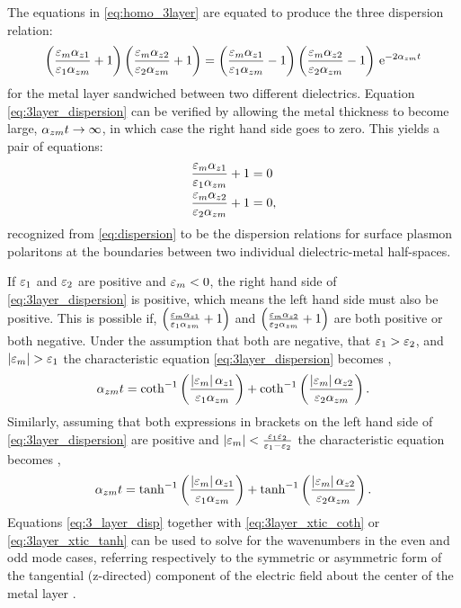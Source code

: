 \documentclass[11pt]{article}
\begin{document}
%
The equations in \eqref{eq:homo_3layer} are equated to produce the three dispersion relation:
%
\begin{equation}
  \left(\frac{\varepsilon_m \alpha_{z1}}{\varepsilon_1 \alpha_{zm}} + 1 \right) \left(\frac{\varepsilon_m \alpha_{z2}}{\varepsilon_2 \alpha_{zm}} + 1 \right) = \left(\frac{\varepsilon_m \alpha_{z1}}{\varepsilon_1 \alpha_{zm}} - 1 \right) \left(\frac{\varepsilon_m \alpha_{z2}}{\varepsilon_2 \alpha_{zm}} - 1 \right) \, \mathrm{e}^{-2\alpha_{zm}t}
  \label{eq:3layer_dispersion}
\end{equation}
%
for the metal layer sandwiched between two different dielectrics. Equation \eqref{eq:3layer_dispersion} can be verified by allowing the metal thickness to become large, $\alpha_{zm}t \rightarrow \infty$, in which case the right hand side goes to zero. This yields a pair of equations:
%
\begin{subequations}
  \begin{align}
    \frac{\varepsilon_m \alpha_{z1}}{\varepsilon_1 \alpha_{zm}} + 1 ={}& 0
    \label{eq:simplified1_3layer_to2layer}\\
    \frac{\varepsilon_m \alpha_{z2}}{\varepsilon_2 \alpha_{zm}} + 1 ={}& 0,
    \label{eq:simplified2_3layer_to2layer}
  \end{align}
  \label{eq:simplified_3layer_to2layer}
\end{subequations}
%
recognized from \eqref{eq:dispersion} to be the dispersion relations for surface plasmon polaritons at the boundaries between two individual dielectric-metal half-spaces.

If $\varepsilon_1$ and $\varepsilon_2$ are positive and $\varepsilon_m < 0$, the right hand side of \eqref{eq:3layer_dispersion} is positive, which means the left hand side must also be positive. This is possible if,
$\left( \frac{\varepsilon_m \alpha_{z1}}{\varepsilon_1 \alpha_{zm}} + 1 \right)$ and
$\left( \frac{\varepsilon_m \alpha_{z2}}{\varepsilon_2 \alpha_{zm}} + 1 \right)$ are both positive or both negative. Under the assumption that both are negative, that
$ \varepsilon_1 > \varepsilon_2 $, and $\left| \varepsilon_m \right| > \varepsilon_1$  the characteristic equation \eqref{eq:3layer_dispersion} becomes \cite{Durach_2007},
%
\begin{equation}
  \alpha_{zm}t = \coth ^{-1} \left( \frac{\left| \varepsilon_m \right|\alpha_{z1}}{\varepsilon_1 \alpha_{zm}} \right) + \coth ^{-1} \left( \frac{\left| \varepsilon_m \right|\alpha_{z2}}{\varepsilon_2 \alpha_{zm}} \right).
  \label{eq:3layer_xtic_coth}
\end{equation}
%
Similarly, assuming that both expressions in brackets on the left hand side of \eqref{eq:3layer_dispersion} are positive and
$\left| \varepsilon_m  \right| < \frac{\varepsilon_1 \varepsilon_2}{\varepsilon_1 - \varepsilon_2}$  the characteristic equation becomes \cite{Durach_2007},
%
\begin{equation}
  \alpha_{zm} t = \tanh^{-1} \left( \frac{\left| \varepsilon_m \right| \alpha_{z1}}{\varepsilon_1 \alpha_{zm}} \right) + \tanh^{-1} \left( \frac{\left| \varepsilon_m \right| \alpha_{z2}}{\varepsilon_2 \alpha_{zm}} \right).
  \label{eq:3layer_xtic_tanh}
\end{equation}
%
Equations \eqref{eq:3_layer_disp} together with \eqref{eq:3layer_xtic_coth} or \eqref{eq:3layer_xtic_tanh} can be used to solve for the wavenumbers in the even and odd mode cases, referring respectively to the symmetric or asymmetric form of the tangential (z-directed) component of the electric field about the center of the metal layer \cite{Burke1986}.
\end{document}

